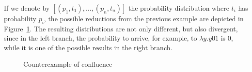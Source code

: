 
If we denote by $[(p_1,t_1),\dots,(p_n,t_n)]$ the probability distribution where $t_i$ has probability $p_i$, the possible reductions from the previous example are depicted in Figure~\ref{fig:noconfl}. The resulting distributions are not only different, but also divergent, since in the left branch, the probability to arrive, for example, to $\lambda y.y01$ is $0$, while it is one of the possible results in the right branch.

\begin{figure}[t]
    \centering
    \caption{Counterexample of confluence}
    \label{fig:noconfl}
\end{figure}



